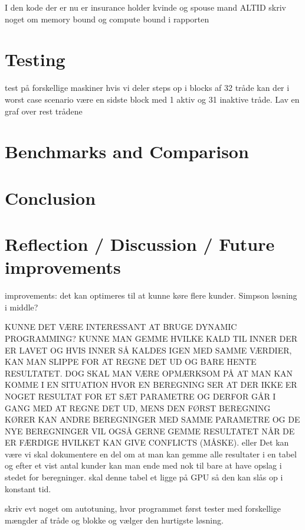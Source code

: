 \documentclass[oribibl]{llncs}
\begin{document}
	
	\label{implementation}
	I den kode der er nu er insurance holder kvinde og spouse mand ALTID
	skriv noget om memory bound og compute bound i rapporten
		
	\section{Testing}
	test på forskellige maskiner
	hvis vi deler steps op i blocks af 32 tråde kan der i worst case scenario være en sidste block med 1 aktiv og 31 inaktive tråde.
	Lav en graf over rest trådene
		
	
	\label{testing}
		
	\section{Benchmarks and Comparison}
		
	
	\label{bandc}
		
	\section{Conclusion}
	
	
	\label{conclusion}
	
	\section{Reflection / Discussion / Future improvements}
	improvements:
	det kan optimeres til at kunne køre flere kunder.
	Simpson løsning i middle?
	
	KUNNE DET VÆRE INTERESSANT AT BRUGE DYNAMIC PROGRAMMING?
	KUNNE MAN GEMME HVILKE KALD TIL INNER DER ER LAVET OG HVIS INNER SÅ KALDES IGEN MED SAMME VÆRDIER, KAN MAN SLIPPE FOR AT REGNE DET UD OG BARE HENTE RESULTATET. DOG SKAL MAN VÆRE OPMÆRKSOM PÅ AT MAN KAN KOMME I EN SITUATION HVOR EN BEREGNING SER AT DER IKKE ER NOGET RESULTAT FOR ET SÆT PARAMETRE OG DERFOR GÅR I GANG MED AT REGNE DET UD, MENS DEN FØRST BEREGNING KØRER KAN ANDRE BEREGNINGER MED SAMME PARAMETRE OG DE NYE BEREGNINGER VIL OGSÅ GERNE GEMME RESULTATET NÅR DE ER FÆRDIGE HVILKET KAN GIVE CONFLICTS (MÅSKE).
	eller
	Det kan være vi skal dokumentere en del om at man kan gemme alle resultater i en tabel og efter et vist antal kunder kan man ende med nok til bare at have opslag i stedet for beregninger. skal denne tabel et ligge på GPU så den kan slås op i konstant tid.
		
		skriv evt noget om autotuning, hvor programmet først tester med forskellige mængder af tråde og blokke og vælger den hurtigste løsning.
		
\end{document}
